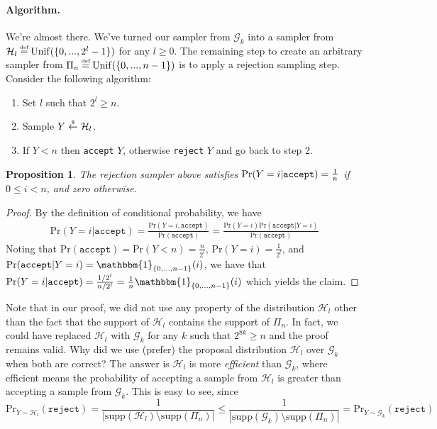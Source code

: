 \documentclass[10pt]{article}
\newtheorem{myprop}{Proposition}
\newcommand{\G}{\mathcal{G}}
\newcommand{\HH}{\mathcal{H}}
\newcommand{\ind}{\mathbbm{1}}
\newcommand{\abs}[1]{\left| #1 \right|}
\newcommand{\Unif}{\mathrm{Unif}}
\newcommand{\supp}{\mathrm{supp}}
\renewcommand{\Pr}{\mathrm{Pr}}
\newcommand\defeq{\stackrel{\mathclap{\normalfont\tiny\mbox{def}}}{=}}
\newcommand\rgets{\stackrel{\mathclap{\normalfont\tiny\mbox{\$}}}{\gets}}
\begin{document}
\paragraph{Algorithm.}
We're almost there. We've turned our sampler from $\G_k$ into a sampler from
$\HH_l \defeq \Unif(\{0, ..., 2^l - 1\})$ for any $l \geq 0$. The remaining step
to create an arbitrary sampler from $\Pi_{n} \defeq \Unif(\{0,...,n-1\})$ is to
apply a rejection sampling step.  Consider the following algorithm:
\begin{enumerate}
  \item Set $l$ such that $2^l \geq n$.
  \item Sample $Y \rgets \HH_l$.
  \item If $Y < n$ then \verb|accept| $Y$, otherwise \verb|reject| $Y$ and go back to step 2.
\end{enumerate}
\begin{myprop}
\label{prop:samp1}
The rejection sampler above satisfies $\Pr(Y=i | \normalfont{\texttt{accept}})
= \frac{1}{n}$ if $0 \leq i < n$, and zero otherwise.
\end{myprop}
\begin{proof}
By the definition of conditional probability, we have
\begin{align}
  \Pr(Y=i|\texttt{accept}) = \frac{\Pr(Y=i, \texttt{accept})}{\Pr(\texttt{accept})} 
  = \frac{\Pr(Y=i)\Pr(\texttt{accept}|Y=i)}{\Pr(\texttt{accept})} \label{eq:condprob}
\end{align}
Noting that $\Pr(\texttt{accept}) = \Pr(Y<n) = \frac{n}{2^l}$, $\Pr(Y=i)=\frac{1}{2^l}$, and 
$\Pr(\texttt{accept}|Y=i) = \ind_{\{0, ..., n-1\}}(i)$, we have 
that $\Pr(Y=i|\texttt{accept}) = \frac{1/2^l}{n/2^l} = \frac{1}{n} \ind_{\{0, ..., n-1\}}(i)$
which yields the claim.
\end{proof}
Note that in our proof, we did not use any property of the distribution $\HH_l$
other than the fact that the support of $\HH_l$ contains the support of $\Pi_n$.
In fact, we could have replaced $\HH_l$ with $\G_k$ for any $k$ such that $2^{8k}
\geq n$ and the proof remains valid. 
Why did we use (prefer) the proposal distribution
$\HH_l$ over $\G_k$ when both are correct? The answer is $\HH_l$ is more \emph{efficient}
than $\G_k$, where efficient means the probability of accepting a sample from 
$\HH_l$ is greater than accepting a sample from $\G_k$. This is easy to see,
since 
\begin{equation*}
    \Pr_{Y \sim \HH_l}(\texttt{reject}) = \frac{1}{\abs{\supp(\HH_l) \setminus \supp(\Pi_n)}}
        \leq \frac{1}{\abs{\supp(\G_k)\setminus\supp(\Pi_n)}} = \Pr_{Y \sim \G_k}(\texttt{reject})
\end{equation*}
\end{document}
